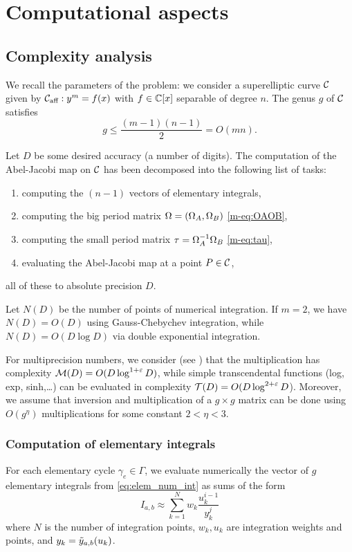 \documentclass[main.tex]{subfiles}
\begin{document}
  \section{Computational aspects}

   \subsection{Complexity analysis}

   We recall the parameters of the problem: we consider a superelliptic curve $\mathcal{C}$ given by
   $\mathcal{C}_{\text{aff}}:y^m=f(x)$ with $f \in \mathbb{C}[x]$ separable of degree $n$. The genus $g$ of $\mathcal{C}$ satisfies
   $$g \leq \frac{(m-1)(n-1)}2=O(mn).$$

   Let $D$ be some desired accuracy (a number of digits). The computation of
   the Abel-Jacobi map on $\mathcal{C}$ has been decomposed into the
   following list of tasks:
   \begin{enumerate}
       \item computing the $(n-1)$ vectors of elementary integrals,
       \item computing the big period matrix $\Omega=(\Omega_A,\Omega_B)$ \eqref{m-eq:OAOB},
       \item computing the small period matrix $\tau = \Omega_A^{-1}\Omega_B$ \eqref{m-eq:tau},
       \item evaluating the Abel-Jacobi map at a point $P \in \mathcal{C}$,
   \end{enumerate}
   all of these to absolute precision $D$.

   Let $N(D)$ be the number of points of numerical integration.
   If $m=2$, we have
   $N(D)=O(D)$ using Gauss-Chebychev integration, while $N(D)=O(D\log D)$
   via double exponential integration.

   For multiprecision numbers, we consider (see \cite{BrentZimmermann}) that the multiplication has
   complexity $\mathcal M(D)=O(D \log^{1+\varepsilon}D)$,
   while simple transcendental functions (log, exp, sinh,\dots) can be evaluated
   in complexity $\mathcal T(D)=O(D\log^{2+\varepsilon} D$).
    Moreover, we assume that inversion and multiplication of a $g \times g$ matrix can be done using
    $O(g^{\eta})$ multiplications for some constant $2 < \eta < 3$.
   
   \subsubsection{Computation of elementary integrals}

   For each elementary cycle $\gamma_e\in \Gamma$, we evaluate numerically the vector of $g$
   elementary integrals from \eqref{eq:elem_num_int} as sums of the form
   \begin{equation}
       I_{a,b} \approx \sum_{k=1}^N w_k\frac{u_k^{i-1}}{y_k^j}
   \end{equation}
   where $N$ is the number of integration points, $w_k,u_k$ are integration weights and points,
   and $y_k=\tilde{y}_{a,b}(u_k)$.
\end{document}
